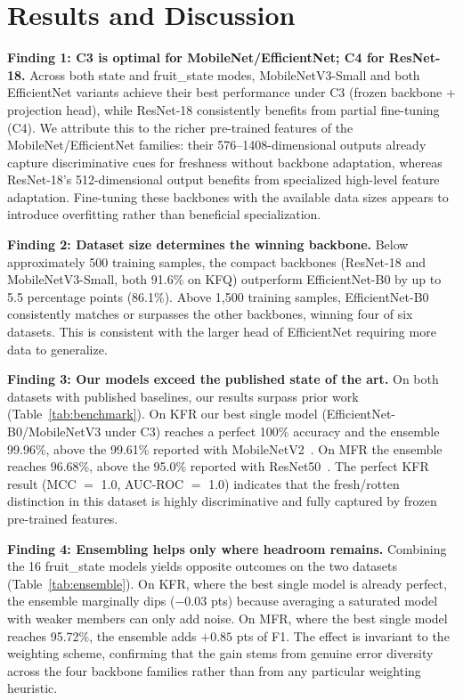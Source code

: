 \documentclass[conference]{IEEEtran}
\begin{document}
\section{Results and Discussion}
\label{sec:discussion}

\textbf{Finding 1: C3 is optimal for MobileNet/EfficientNet; C4 for ResNet-18.}
Across both state and fruit\_state modes, MobileNetV3-Small and both
EfficientNet variants achieve their best performance under C3 (frozen
backbone + projection head), while ResNet-18 consistently benefits from
partial fine-tuning (C4).
We attribute this to the richer pre-trained features of the
MobileNet/EfficientNet families: their 576--1408-dimensional outputs
already capture discriminative cues for freshness without backbone
adaptation, whereas ResNet-18's 512-dimensional output benefits from
specialized high-level feature adaptation.
Fine-tuning these backbones with the available data sizes appears to
introduce overfitting rather than beneficial specialization.

\textbf{Finding 2: Dataset size determines the winning backbone.}
Below approximately 500 training samples, the compact backbones (ResNet-18
and MobileNetV3-Small, both 91.6\% on KFQ) outperform EfficientNet-B0
by up to 5.5 percentage points (86.1\%).
Above 1,500 training samples, EfficientNet-B0 consistently matches or
surpasses the other backbones, winning four of six datasets.
This is consistent with the larger head of EfficientNet requiring more
data to generalize.

\textbf{Finding 3: Our models exceed the published state of the art.}
On both datasets with published baselines, our results surpass prior work
(Table~\ref{tab:benchmark}).
On KFR our best single model (EfficientNet-B0/MobileNetV3 under C3) reaches
a perfect 100\% accuracy and the ensemble 99.96\%, above the 99.61\%
reported with MobileNetV2~\cite{chakraborty2021implementation}.
On MFR the ensemble reaches 96.68\%, above the 95.0\% reported with
ResNet50~\cite{sharma2025automated}.
The perfect KFR result (MCC $=$ 1.0, AUC-ROC $=$ 1.0) indicates that the
fresh/rotten distinction in this dataset is highly discriminative and fully
captured by frozen pre-trained features.

\textbf{Finding 4: Ensembling helps only where headroom remains.}
Combining the 16 fruit\_state models yields opposite outcomes on the two
datasets (Table~\ref{tab:ensemble}).
On KFR, where the best single model is already perfect, the ensemble
marginally dips ($-0.03$ pts) because averaging a saturated model with
weaker members can only add noise.
On MFR, where the best single model reaches 95.72\%, the ensemble adds
$+0.85$ pts of F1.
The effect is invariant to the weighting scheme, confirming that the gain
stems from genuine error diversity across the four backbone families rather
than from any particular weighting heuristic.
\end{document}
